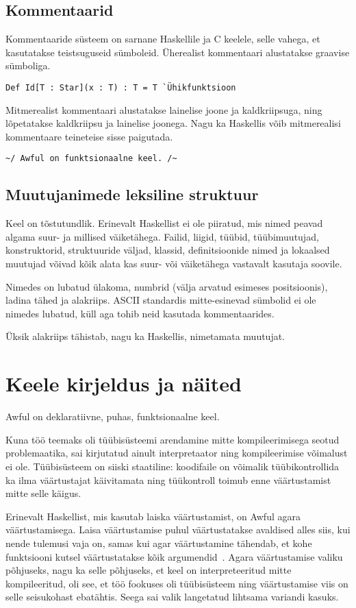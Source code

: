 \documentclass[12pt]{article}
\newcommand\peatykk[1]{
  \clearpage
  \section{#1}}
\begin{document}
    \subsection{Kommentaarid}\label{kommentaarid}
      Kommentaaride süsteem on sarnane Haskellile ja C keelele, selle vahega, et kasutatakse teistsuguseid sümboleid. Üherealist kommentaari alustatakse graavise sümboliga.

      \begin{verbatim}Def Id[T : Star](x : T) : T = T `Ühikfunktsioon\end{verbatim}

      Mitmerealist kommentaari alustatakse lainelise joone ja kaldkriipsuga, ning lõpetatakse kaldkriipsu ja lainelise joonega. Nagu ka Haskellis võib mitmerealisi kommentaare teineteise sisse paigutada.

      \begin{verbatim}~/ Awful on funktsionaalne keel. /~\end{verbatim}
    \subsection{Muutujanimede leksiline struktuur}\label{muutujanimed}
      Keel on tõstutundlik. Erinevalt Haskellist ei ole piiratud, mis nimed peavad algama suur- ja millised väiketähega. Failid, liigid, tüübid, tüübimuutujad, konstruktorid, struktuuride väljad, klassid, definitsioonide nimed ja lokaalsed muutujad võivad kõik alata kas suur- või väiketähega vastavalt kasutaja soovile.

      Nimedes on lubatud ülakoma, numbrid (välja arvatud esimeses positsioonis), ladina tähed ja alakriips. ASCII standardis mitte-esinevad sümbolid ei ole nimedes lubatud, küll aga tohib neid kasutada kommentaarides.

      Üksik alakriips tähistab, nagu ka Haskellis, nimetamata muutujat.
  \peatykk{Keele kirjeldus ja näited}\label{manual}
    Awful on deklaratiivne, puhas, funktsionaalne keel.

    Kuna töö teemaks oli tüübisüsteemi arendamine mitte kompileerimisega seotud problemaatika, sai kirjutatud ainult interpretaator ning kompileerimise võimalust ei ole. Tüübisüsteem on siiski staatiline: koodifaile on võimalik tüübikontrollida ka ilma väärtustajat käivitamata ning tüükontroll toimub enne väärtustamist mitte selle käigus.

    Erinevalt Haskellist, mis kasutab laiska väärtustamist, on Awful agara väärtustamisega. Laisa väärtustamise puhul väärtustatakse avaldised alles siis, kui nende tulemusi vaja on, samas kui agar väärtustamine tähendab, et kohe funktsiooni kutsel väärtustatakse kõik argumendid~\cite{Sem}. Agara väärtustamise valiku põhjuseks, nagu ka selle põhjuseks, et keel on interpreteeritud mitte kompileeritud, oli see, et töö fookuses oli tüübisüsteem ning väärtustamise viis on selle seisukohast ebatähtis. Seega sai valik langetatud lihtsama variandi kasuks.
\end{document}

